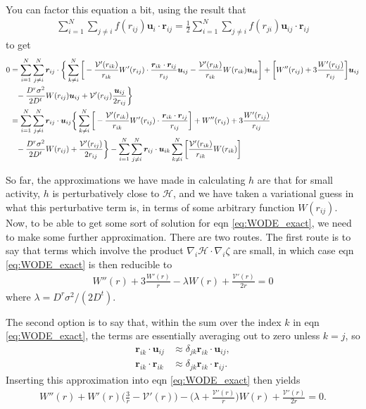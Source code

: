 \documentclass{article}
\begin{document}
You can factor this equation a bit, using the result that
\begin{align}
  \sum_{i=1}^N\sum_{j\neq i}f(r_{ij}) \bm{u}_i\cdot\bm{r}_{ij}
  =\frac{1}{2}\sum_{i=1}^N\sum_{j\neq i}f(r_{ji})\bm{u}_{ij}\cdot\bm{r}_{ij}
\end{align}
  to get
\begin{align}\label{eq:WODE_exact}
  0&=
     \sum_{i=1}^N\sum_{j\neq i}^N\bm{r}_{ij}\cdot\bigg\{\sum_{k\neq i}^N\bigg[
     -\frac{\mathcal{V}^{\prime}(r_{ik})}{r_{ik}}
     W'(r_{ij})
     \cdot\frac{\bm{r}_{ik}\cdot\bm{r}_{ij}}{r_{ij}}\bm{u}_{ij}
     -\frac{\mathcal{V}^{\prime}(r_{ik})}{r_{ik}}W(r_{ik})\bm{u}_{ik}\bigg]
     +\bigg[W''(r_{ij})
     +3\frac{W'(r_{ij})}{r_{ij}}\bigg]\bm{u}_{ij}\nonumber\\
   &\hphantom{=}-\frac{D^r\sigma^2}{2D^t}W(r_{ij})\bm{u}_{ij}
     +\mathcal{V}^{\prime}(r_{ij})\frac{\bm{u}_{ij}}{2r_{ij}}\bigg\}\nonumber\\
   &=\sum_{i=1}^N\sum_{j\neq i}^N\bm{r}_{ij}\cdot\bm{u}_{ij}
     \bigg\{\sum_{k\neq i}^N\bigg[
     -\frac{\mathcal{V}^{\prime}(r_{ik})}{r_{ik}}
     W'(r_{ij})
     \cdot\frac{\bm{r}_{ik}\cdot\bm{r}_{ij}}{r_{ij}}\bigg]
     +W''(r_{ij})+3\frac{W'(r_{ij})}{r_{ij}}\nonumber\\
   &\hphantom{=}-\frac{D^r\sigma^2}{2D^t}W(r_{ij})
     +\frac{\mathcal{V}^{\prime}(r_{ij})}{2r_{ij}}\bigg\}
     -\sum_{i=1}^N\sum_{j\neq i}^N\bm{r}_{ij}\cdot\bm{u}_{ik}
     \sum_{k\neq i}^N\bigg[
     \frac{\mathcal{V}^{\prime}(r_{ik})}{r_{ik}}W(r_{ik})\bigg]
\end{align}

So far, the approximations we have made in calculating $h$ are that for small activity,
$h$ is perturbatively close to $\mathcal{H}$, and we have taken a variational guess in
what this perturbative term is, in terms of some arbitrary function $W(r_{ij})$. Now, to
be able to get some sort of solution for eqn \ref{eq:WODE_exact}, we need to make some
further approximation. There are two routes. The first route is to say that terms which
involve the product $\nabla_i\mathcal{H}\cdot\nabla_i \zeta$ are small, in which case eqn
\ref{eq:WODE_exact} is then reducible to
\begin{align}
  W''(r)+3\frac{W'(r)}{r}-\lambda W(r)+\frac{\mathcal{V}'(r)}{2r}=0
\end{align}
where $\lambda=D^r\sigma^2/(2D^t)$.

The second option is to say that, within the sum over the index $k$ in eqn
\ref{eq:WODE_exact}, the terms are essentially averaging out to zero unless $k=j$,
so
\begin{align}
  \bm{r}_{ik}\cdot\bm{u}_{ij}&\approx\delta_{jk}\bm{r}_{ik}\cdot\bm{u}_{ij},\\
  \bm{r}_{ik}\cdot\bm{r}_{ik}&\approx\delta_{jk}\bm{r}_{ik}\cdot\bm{r}_{ij}.
\end{align}
Inserting this approximation into eqn \ref{eq:WODE_exact} then yields
\begin{align}
  W''(r)+W'(r)\bigg(\frac{3}{r}-\mathcal{V}'(r)\bigg)-\bigg(\lambda
  + \frac{\mathcal{V}'(r)}{r}\bigg) W(r)+\frac{\mathcal{V}'(r)}{2r}=0.
\end{align}
\end{document}
